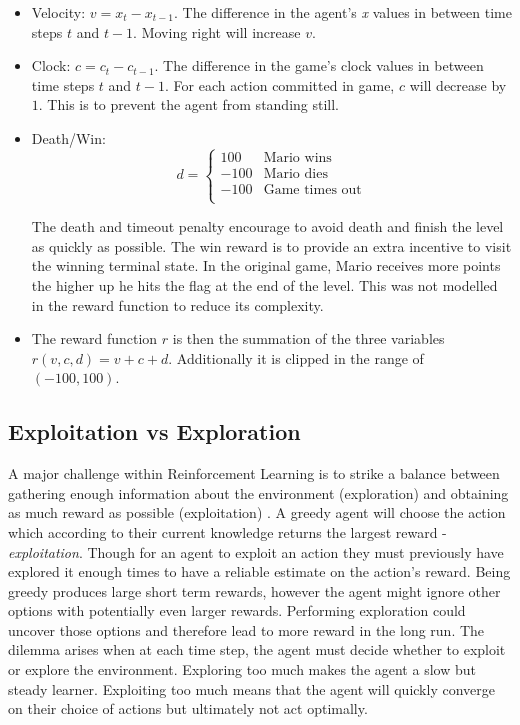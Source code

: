 \documentclass[notitlepage,a4paper,11pt]{article}
\begin{document}
\begin{itemize}

	\item Velocity: $v = x_t - x_{t-1}$. The difference in the agent's \textit{x} values in between time steps $t$ and $t - 1$. Moving right will increase $v$.
	
	\item Clock: $c = c_t - c_{t-1}$. The difference in the game's clock values in between time steps $t$ and $t - 1$. For each action committed in game, $c$ will decrease by $1$. This is to prevent the agent from standing still.
	
	\item Death/Win: 
		\begin{equation*}
   	 		d = \begin{cases}
               			100               & \text{Mario wins}\\
               			-100              & \text{Mario dies}\\
               			-100				 & \text{Game times out}\\
           			\end{cases}
		\end{equation*}
		
		The death and timeout penalty encourage to avoid death and finish the level as quickly as possible. The win reward is to provide an extra incentive to visit the winning terminal state. In the original game, Mario receives more points the higher up he hits the flag at the end of the level. This was not modelled in the reward function to reduce its complexity.
		
	\item The reward function $r$ is then the summation of the three variables $r(v, c, d) = v + c + d$. Additionally it is clipped in the range of $(-100, 100)$.
	
	
\end{itemize}


\subsection{Exploitation vs Exploration}\label{exploit_explore}
A major challenge within Reinforcement Learning is to strike a balance between gathering enough information about the environment (exploration) and obtaining as much reward as possible (exploitation) \cite{sutton2011reinforcement}. A greedy agent will choose the action which according to their current knowledge returns the largest reward - \textit{exploitation}. Though for an agent to exploit an action they must previously have explored it enough times to have a reliable estimate on the action's reward. Being greedy produces large short term rewards, however the agent might ignore other options with potentially even larger rewards. Performing exploration could uncover those options and therefore lead to more reward in the long run. The dilemma arises when at each time step, the agent must decide whether to exploit or explore the environment. Exploring too much makes the agent a slow but steady learner. Exploiting too much means that the agent will quickly converge on their choice of actions but ultimately not act optimally.
\end{document}
